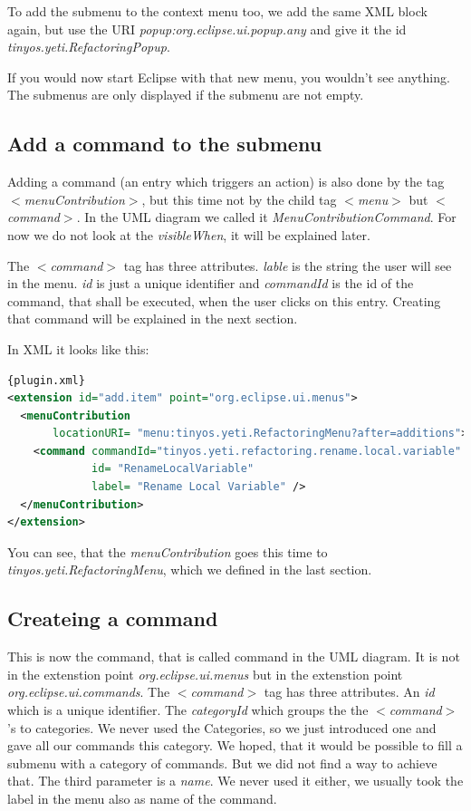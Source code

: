 \documentclass[a4paper,10pt]{report}
\begin{document}
To add the submenu to the context menu too, we add the same XML block again, but use the URI {\it popup:org.eclipse.ui.popup.any} and give it the id {\it tinyos.yeti.RefactoringPopup}.

If you would now start Eclipse with that new menu, you wouldn't see anything. The submenus are only displayed if the submenu are not empty.

\subsection{Add a command to the submenu}
Adding a command (an entry which triggers an action) is also done by the tag {\it $<$menuContribution$>$}, but this time not by the child tag {\it $<$menu$>$} but {\it $<$command$>$}.
In the UML diagram we called it {\it MenuContributionCommand}. For now we do not look at the {\it visibleWhen}, it will be explained later.

The {\it $<$command$>$} tag has three attributes. {\it lable} is the string the user will see in the menu.
{\it id} is just a unique identifier and {\it commandId} is the id of the command, that shall be executed, when the user clicks on this entry.
Creating that command will be explained in the next section.

In XML it looks like this:
\begin{lstlisting}[language=XML,caption=Adding a command to a menu ({\it plugin.xml})]{plugin.xml}
<extension id="add.item" point="org.eclipse.ui.menus">
  <menuContribution
       locationURI= "menu:tinyos.yeti.RefactoringMenu?after=additions">
    <command commandId="tinyos.yeti.refactoring.rename.local.variable"
             id= "RenameLocalVariable"
             label= "Rename Local Variable" />
  </menuContribution>
</extension>
\end{lstlisting}
You can see, that the {\it menuContribution} goes this time to {\it tinyos.yeti.RefactoringMenu}, which we defined in the last section.

\subsection{Createing a command}
This is now the command, that is called command in the UML diagram.
It is not in the extenstion point {\it org.eclipse.ui.menus} but in the extenstion point {\it org.eclipse.ui.commands}. 
The {\it $<$command$>$} tag has three attributes. An {\it id} which is a unique identifier.
The {\it categoryId} which groups the the {\it $<$command$>$}'s to categories.
We never used the Categories, so we just introduced one and gave all our commands this category.
We hoped, that it would be possible to fill a submenu with a category of commands.
But we did not find a way to achieve that. The third parameter is a {\it name}.
We never used it either, we usually took the label in the menu also as name of the command.
\end{document}
